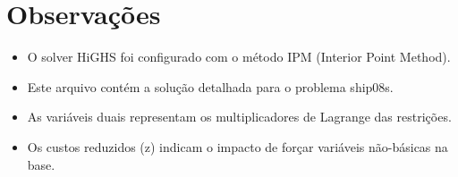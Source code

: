 \documentclass[12pt]{article}
\begin{document}
\section{Observações}

\begin{itemize}
\item O solver HiGHS foi configurado com o método IPM (Interior Point Method).
\item Este arquivo contém a solução detalhada para o problema ship08s.
\item As variáveis duais representam os multiplicadores de Lagrange das restrições.
\item Os custos reduzidos (z) indicam o impacto de forçar variáveis não-básicas na base.
\end{itemize}
\end{document}
